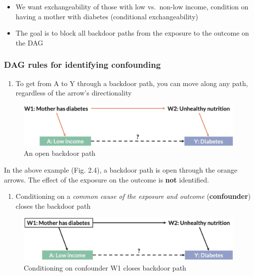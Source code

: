 \documentclass[
]{book}
\providecommand{\tightlist}{%
  \setlength{\itemsep}{0pt}\setlength{\parskip}{0pt}}
\begin{document}
\begin{itemize}
\tightlist
\item
  We want exchangeability of those with low vs.~non-low income, condition on having a mother with diabetes (conditional exchangeability)
\item
  The goal is to block all backdoor paths from the exposure to the outcome on the DAG
\end{itemize}

\hypertarget{dag-rules-for-identifying-confounding}{%
\subsubsection{DAG rules for identifying confounding}\label{dag-rules-for-identifying-confounding}}

\begin{enumerate}
\def\labelenumi{\arabic{enumi}.}
\tightlist
\item
  To get from A to Y through a backdoor path, you can move along any path, regardless of the arrow's directionality
\end{enumerate}

\begin{figure}

{\centering \includegraphics[width=1\linewidth]{img/confounding/dag_rules_1} 

}

\caption{An open backdoor path}\label{fig:unnamed-chunk-13}
\end{figure}

In the above example (Fig. 2.4), a backdoor path is open through the orange arrows. The effect of the exposure on the outcome is \textbf{not} identified.

\begin{enumerate}
\def\labelenumi{\arabic{enumi}.}
\setcounter{enumi}{1}
\tightlist
\item
  Conditioning on a \emph{common cause of the exposure and outcome} (\textbf{confounder}) closes the backdoor path
\end{enumerate}

\begin{figure}

{\centering \includegraphics[width=1\linewidth]{img/confounding/dag_rules_2} 

}

\caption{Conditioning on confounder W1 closes backdoor path}\label{fig:unnamed-chunk-14}
\end{figure}
\end{document}
